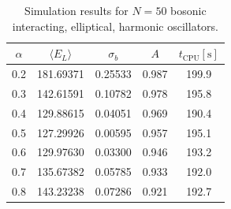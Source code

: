 \documentclass[
    a4paper, aps, twocolumn, floatfix, superscriptaddress,
    nofootinbib]{revtex4-1}
\newcommand{\1}{\mathds{1}}
\begin{document}
        \begin{table}
            \caption{Simulation results for $N = 50$ bosonic interacting,
            elliptical, harmonic oscillators.}
            \centering
            \begin{ruledtabular}
                \begin{tabular}{ccccc}
                    $\alpha$ & $\langle  E_L\rangle$ & $\sigma_b$
                    & $A$ & $t_{\text{CPU}} [\si{\second}]$ \\
                    \hline
                    0.2&181.69371&0.25533&0.987%
                    &199.9\\%
                    0.3&142.61591&0.10782&0.978%
                    &195.8\\%
                    0.4&129.88615&0.04051&0.969%
                    &190.4\\%
                    0.5&127.29926&0.00595&0.957%
                    &195.1\\%
                    0.6&129.97630&0.03300&0.946%
                    &193.2\\%
                    0.7&135.67382&0.05785&0.933%
                    &192.0\\%
                    0.8&143.23238&0.07286&0.921%
                    &192.7\\%
                \end{tabular}
            \end{ruledtabular}
            \label{tab:50_interacting}
        \end{table}
\end{document}
